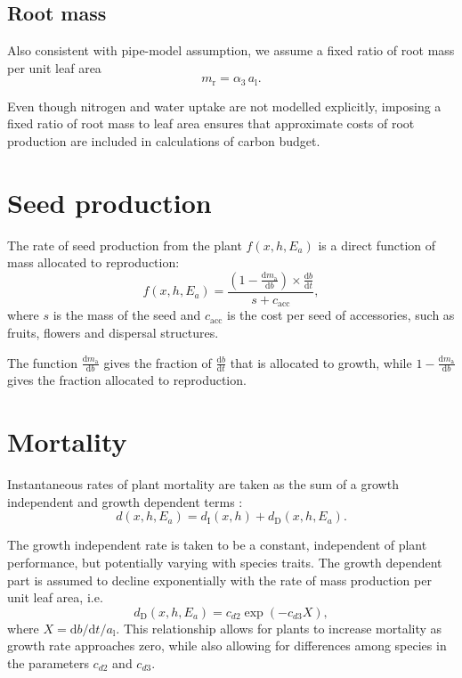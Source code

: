 \documentclass[10pt,twoside]{article}
\begin{document}
\subsection{Root mass}\label{root-mass}

Also consistent with pipe-model assumption, we assume a fixed ratio of
root mass per unit leaf area
\begin{equation}\label{eq:mr}
m_\textrm{r}=\alpha_3 \, a_\textrm{l}.
\end{equation}

Even though nitrogen and water uptake are not modelled explicitly,
imposing a fixed ratio of root mass to leaf area ensures that
approximate costs of root production are included in calculations of
carbon budget.

\section{Seed production}\label{seed-production}

The rate of seed production from the plant \(f(x,h,E_a)\) is a direct
function of mass allocated to reproduction:
\begin{equation}\label{eq:fecundity}
f(x,h,E_a) = \frac{(1-\frac{\textrm{d}m_\textrm{a}}{\textrm{d}b}) \times \frac{\textrm{d}b}{\textrm{d}t}}{
  s + c_{\textrm{acc}}},
\end{equation}
where \(s\) is the mass of the seed and \(c_{\textrm{acc}}\) is the cost
per seed of accessories, such as fruits, flowers and dispersal
structures.

The function $\frac{\textrm{d}m_\textrm{a}}{\textrm{d}b}$ gives the fraction
of $\frac{\textrm{d}b}{\textrm{d}t}$ that is allocated to growth, while 
$1-\frac{\textrm{d}m_\textrm{a}}{\textrm{d}b}$ gives the  fraction allocated
to reproduction.

\section{Mortality}\label{mortality}

Instantaneous rates of plant mortality are taken as the sum of a growth
independent and growth dependent terms
\citep{Falster-2011, Moorcroft-2001}:
\begin{equation}\label{eq:mortality}
d(x,h,E_a) = d_{\textrm{I}}(x,h) + d_{\textrm{D}}(x,h,E_a).
\end{equation}

The growth independent rate is taken to be a constant, independent of
plant performance, but potentially varying with species traits. The
growth dependent part is assumed to decline exponentially with the rate
of mass production per unit leaf area, i.e.
\begin{equation}\label{eq:mortality_GD}
d_{\textrm{D}}(x,h,E_a) =  c_{d2}  \exp(-c_{d3} X),
\end{equation}
where \(X = \textrm{d}b / \textrm{d}t / a_\textrm{l}\). This
relationship allows for plants to increase mortality as growth rate
approaches zero, while also allowing for differences among species in
the parameters \(c_{d2}\) and \(c_{d3}\).
\end{document}
